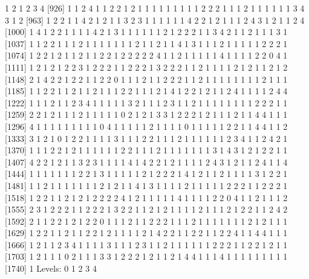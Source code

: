 \documentclass[
]{article}
\begin{document}
1 2 1 2 3 4 {[}926{]} 1 1 2 4 1 1 2 2 1 2 1 1 1 1 1 1 1 1 1 2 2 2 1 1 1
2 1 1 1 1 1 1 3 4 3 1 2 {[}963{]} 1 2 2 1 1 4 2 1 2 1 1 3 2 3 1 1 1 1 1
1 4 2 2 1 2 1 1 1 2 4 3 1 2 1 1 2 4 {[}1000{]} 1 4 1 2 2 1 1 1 1 4 2 1 3
1 1 1 1 1 1 2 1 2 2 2 1 1 3 4 2 1 1 2 1 1 1 3 1 {[}1037{]} 1 1 2 2 1 1 1
2 1 1 1 1 1 1 1 2 1 1 2 1 1 4 1 3 1 1 1 2 1 1 1 1 1 2 2 2 1 {[}1074{]} 1
2 2 1 2 1 1 2 1 1 2 2 1 2 2 2 2 2 4 1 1 2 1 1 1 1 1 4 1 1 1 1 2 2 0 4 1
{[}1111{]} 1 2 1 2 1 2 2 3 1 2 2 2 1 1 2 2 2 1 3 2 2 2 1 1 2 1 1 1 1 2 1
2 1 1 2 1 2 {[}1148{]} 2 1 4 2 2 1 2 2 1 1 2 2 0 1 1 1 2 1 1 2 2 2 1 1 2
1 1 1 1 1 1 1 1 2 1 1 1 {[}1185{]} 1 1 2 2 1 1 2 1 1 2 1 1 1 2 2 1 1 1 2
1 4 1 2 2 1 2 1 1 2 4 1 1 1 1 2 4 4 {[}1222{]} 1 1 1 2 1 1 2 3 4 1 1 1 1
1 3 2 1 1 1 2 3 1 1 2 1 1 1 1 1 1 1 1 2 2 2 1 1 {[}1259{]} 2 2 1 2 1 1 1
2 1 1 1 1 1 0 2 1 2 1 3 3 1 2 2 2 1 2 1 1 1 2 1 1 4 4 1 1 1 {[}1296{]} 4
1 1 1 1 1 1 1 1 1 0 4 1 1 1 1 1 2 1 1 1 1 0 1 1 1 1 1 2 2 1 1 4 4 1 1 2
{[}1333{]} 3 1 2 1 0 1 2 2 1 1 1 1 3 1 1 1 2 2 1 1 1 2 1 1 1 1 1 1 2 3 4
1 1 2 4 2 1 {[}1370{]} 1 1 1 2 2 1 2 1 1 1 1 1 1 2 2 1 1 1 2 1 1 1 1 1 1
1 3 1 4 3 1 2 1 2 2 1 1 {[}1407{]} 4 2 2 1 2 1 1 3 2 3 1 1 1 1 4 1 4 2 2
1 2 1 1 1 1 2 4 3 1 2 1 1 2 4 1 1 4 {[}1444{]} 1 1 1 1 1 1 1 2 2 1 3 1 1
1 1 1 2 1 2 2 2 1 4 1 2 1 1 2 1 1 1 1 3 1 2 2 1 {[}1481{]} 1 1 2 1 1 1 1
1 1 1 2 1 2 1 1 4 1 3 1 1 1 1 2 1 1 1 1 1 2 2 2 1 1 2 2 2 1 {[}1518{]} 1
2 2 1 1 2 1 2 1 2 2 2 2 4 1 2 1 1 1 1 1 4 1 1 1 1 2 2 0 4 1 1 2 1 1 1 2
{[}1555{]} 2 3 1 2 2 2 1 1 2 2 2 1 3 2 2 1 1 2 1 2 1 1 1 1 2 1 1 1 2 1 2
2 1 1 2 4 2 {[}1592{]} 2 1 1 2 2 1 2 1 2 2 0 1 1 1 2 1 1 2 2 2 1 1 1 2 1
1 1 1 1 1 1 2 1 2 1 1 1 {[}1629{]} 1 2 2 1 1 2 1 1 2 2 1 2 1 1 1 1 2 1 4
2 2 1 1 2 2 1 1 2 2 4 1 1 4 4 1 1 1 {[}1666{]} 1 2 1 1 2 3 4 1 1 1 1 3 1
1 1 2 3 1 1 2 1 1 1 1 1 1 2 2 2 1 1 2 2 1 2 1 1 {[}1703{]} 1 2 1 1 1 0 2
1 1 1 3 3 1 2 2 2 1 2 1 1 2 1 4 4 1 1 1 4 1 1 1 1 1 1 1 1 1 {[}1740{]} 1
Levels: 0 1 2 3 4
\end{document}
